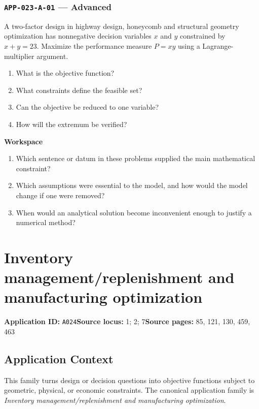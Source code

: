 \documentclass[11pt]{book}
\newcommand{\pid}[1]{\texttt{#1}}
\newcommand{\workspace}{\par\vspace{0.7in}\hrulefill\par\vspace{0.55in}\hrulefill\par}
\begin{document}
\subsection*{\pid{APP-023-A-01} — Advanced}
\begin{problembox}
A two-factor design in highway design, honeycomb and structural geometry optimization has nonnegative decision variables $x$ and $y$ constrained by $x+y=23$. Maximize the performance measure $P=xy$ using a Lagrange-multiplier argument.
\end{problembox}
\begin{promptbox}\begin{enumerate}
\item What is the objective function?
\item What constraints define the feasible set?
\item Can the objective be reduced to one variable?
\item How will the extremum be verified?
\end{enumerate}\end{promptbox}
\textbf{Workspace}\workspace
\begin{reflectionbox}\begin{enumerate}
\item Which sentence or datum in these problems supplied the main mathematical constraint?
\item Which assumptions were essential to the model, and how would the model change if one were removed?
\item When would an analytical solution become inconvenient enough to justify a numerical method?
\end{enumerate}\end{reflectionbox}
\chapter{Inventory management/replenishment and manufacturing optimization}\label{app:A024}
\textbf{Application ID:} \pid{A024}\quad \textbf{Source locus:} 1; 2; 7\quad \textbf{Source pages:} 85, 121, 130, 459, 463
\section*{Application Context}
This family turns design or decision questions into objective functions subject to geometric, physical, or economic constraints. The canonical application family is \emph{Inventory management/replenishment and manufacturing optimization}.
\end{document}
